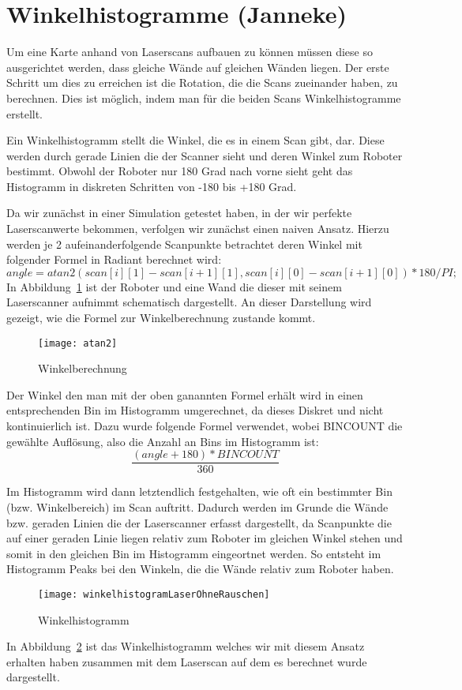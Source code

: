 \section{Winkelhistogramme (Janneke)}

Um eine Karte anhand von Laserscans aufbauen zu können müssen diese so ausgerichtet werden, dass gleiche Wände auf gleichen Wänden liegen. Der erste Schritt um dies zu erreichen ist die Rotation, die die Scans zueinander haben, zu berechnen. Dies ist möglich, indem man für die beiden Scans Winkelhistogramme erstellt.

Ein Winkelhistogramm stellt die Winkel, die es in einem Scan gibt, dar. Diese werden durch gerade Linien die der Scanner sieht und deren Winkel zum Roboter bestimmt. Obwohl der Roboter nur 180 Grad nach vorne sieht geht das Histogramm in diskreten Schritten von -180 bis +180 Grad.

Da wir zunächst in einer Simulation getestet haben, in der wir perfekte Laserscanwerte bekommen, verfolgen wir zunächst einen naiven Ansatz. Hierzu werden je 2 aufeinanderfolgende Scanpunkte betrachtet deren Winkel mit folgender Formel in Radiant berechnet wird: $$angle = atan2(scan[i][1] - scan[i+1][1], scan[i][0] - scan[i+1][0]) * 180 /PI;$$ In Abbildung~\ref{fig:Winkelberechnung} ist der Roboter und eine Wand die dieser mit seinem Laserscanner aufnimmt schematisch dargestellt. An dieser Darstellung wird gezeigt, wie die Formel zur Winkelberechnung zustande kommt.

\begin{figure}
	\centering
	\texttt{[image: atan2]}
	\caption{Winkelberechnung}
	\label{fig:Winkelberechnung}
\end{figure}

Der Winkel den man mit der oben ganannten Formel erhält wird in einen entsprechenden Bin im Histogramm umgerechnet, da dieses Diskret und nicht kontinuierlich ist. Dazu wurde folgende Formel verwendet, wobei BINCOUNT die gewählte Auflösung, also die Anzahl an Bins im Histogramm ist: $$\frac{(angle + 180) * BINCOUNT}{360}$$

Im Histogramm wird dann letztendlich festgehalten, wie oft ein bestimmter Bin (bzw. Winkelbereich) im Scan auftritt. Dadurch werden im Grunde die Wände bzw. geraden Linien die der Laserscanner erfasst dargestellt, da Scanpunkte die auf einer geraden Linie liegen relativ zum Roboter im gleichen Winkel stehen und somit in den gleichen Bin im Histogramm eingeortnet werden. So entsteht im Histogramm Peaks bei den Winkeln, die die Wände relativ zum Roboter haben.

\begin{figure}
	\centering
	\texttt{[image: winkelhistogramLaserOhneRauschen]}
	\caption{Winkelhistogramm}
	\label{fig:Winkelhistogramm}
\end{figure}

In Abbildung~\ref{fig:Winkelhistogramm} ist das Winkelhistogramm welches wir mit diesem Ansatz erhalten haben zusammen mit dem Laserscan auf dem es berechnet wurde dargestellt.